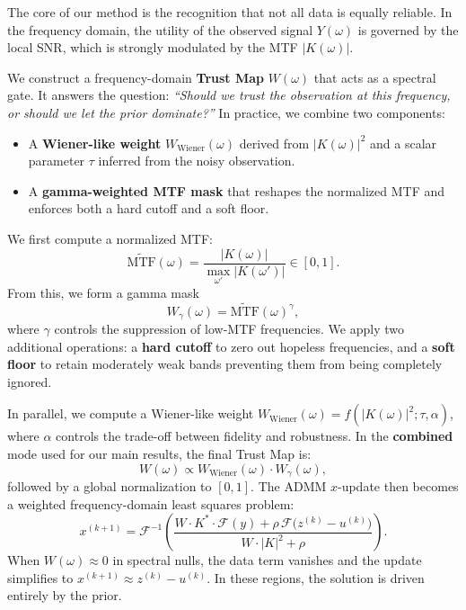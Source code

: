 \documentclass[10pt,journal,compsoc]{IEEEtran}
\begin{document}
The core of our method is the recognition that not all data is equally reliable. In the frequency domain, the utility of the observed signal $Y(\omega)$ is governed by the local SNR, which is strongly modulated by the MTF $|K(\omega)|$.

We construct a frequency-domain \textbf{Trust Map} $W(\omega)$ that acts as a spectral gate. It answers the question: \textit{``Should we trust the observation at this frequency, or should we let the prior dominate?''} In practice, we combine two components:
\begin{itemize}
    \item A \textbf{Wiener-like weight} $W_{\text{Wiener}}(\omega)$ derived from $|K(\omega)|^2$ and a scalar parameter $\tau$ inferred from the noisy observation.
    \item A \textbf{gamma-weighted MTF mask} that reshapes the normalized MTF and enforces both a hard cutoff and a soft floor.
\end{itemize}

We first compute a normalized MTF:
\begin{equation}
\widetilde{\text{MTF}}(\omega) = \frac{|K(\omega)|}{\max_{\omega'} |K(\omega')|} \in [0, 1].
\end{equation}
From this, we form a gamma mask
\begin{equation}
W_{\gamma}(\omega) = \widetilde{\text{MTF}}(\omega)^{\gamma},
\end{equation}
where $\gamma$ controls the suppression of low-MTF frequencies. We apply two additional operations: a \textbf{hard cutoff} to zero out hopeless frequencies, and a \textbf{soft floor} to retain moderately weak bands preventing them from being completely ignored.

In parallel, we compute a Wiener-like weight $W_{\text{Wiener}}(\omega) = f(|K(\omega)|^2; \tau, \alpha)$, where $\alpha$ controls the trade-off between fidelity and robustness. In the \textbf{combined} mode used for our main results, the final Trust Map is:
\begin{equation}
W(\omega) \propto W_{\text{Wiener}}(\omega) \cdot W_{\gamma}(\omega),
\end{equation}
followed by a global normalization to $[0, 1]$. The ADMM $x$-update then becomes a weighted frequency-domain least squares problem:
\begin{equation}
x^{(k+1)} = \mathcal{F}^{-1}\!\left(
\frac{W \cdot K^* \cdot \mathcal{F}(y)
+ \rho \, \mathcal{F}\big(z^{(k)} - u^{(k)}\big)}
{W \cdot |K|^2 + \rho}
\right).
\end{equation}
When $W(\omega) \approx 0$ in spectral nulls, the data term vanishes and the update simplifies to $x^{(k+1)} \approx z^{(k)} - u^{(k)}$. In these regions, the solution is driven entirely by the prior.
\end{document}

